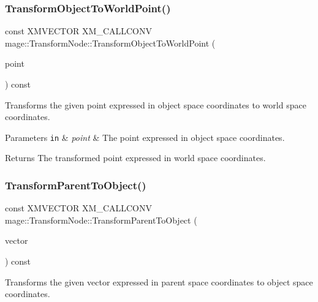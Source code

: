 \subsubsection{\texorpdfstring{Transform\+Object\+To\+World\+Point()}{TransformObjectToWorldPoint()}}
{\footnotesize\ttfamily const X\+M\+V\+E\+C\+T\+OR X\+M\+\_\+\+C\+A\+L\+L\+C\+O\+NV mage\+::\+Transform\+Node\+::\+Transform\+Object\+To\+World\+Point (\begin{DoxyParamCaption}\item[{F\+X\+M\+V\+E\+C\+T\+OR}]{point }\end{DoxyParamCaption}) const\hspace{0.3cm}{\ttfamily [noexcept]}}

Transforms the given point expressed in object space coordinates to world space coordinates.


\begin{DoxyParams}[1]{Parameters}
\mbox{\tt in}  & {\em point} & The point expressed in object space coordinates. \\
\hline
\end{DoxyParams}
\begin{DoxyReturn}{Returns}
The transformed point expressed in world space coordinates. 
\end{DoxyReturn}
\hypertarget{structmage_1_1_transform_node_aa649804646f82257522c5136f0d4d2a0}{}\label{structmage_1_1_transform_node_aa649804646f82257522c5136f0d4d2a0} 
\subsubsection{\texorpdfstring{Transform\+Parent\+To\+Object()}{TransformParentToObject()}}
{\footnotesize\ttfamily const X\+M\+V\+E\+C\+T\+OR X\+M\+\_\+\+C\+A\+L\+L\+C\+O\+NV mage\+::\+Transform\+Node\+::\+Transform\+Parent\+To\+Object (\begin{DoxyParamCaption}\item[{F\+X\+M\+V\+E\+C\+T\+OR}]{vector }\end{DoxyParamCaption}) const\hspace{0.3cm}{\ttfamily [noexcept]}}

Transforms the given vector expressed in parent space coordinates to object space coordinates.


